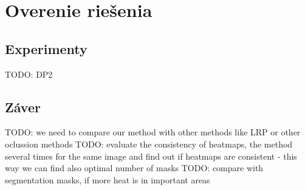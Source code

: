 \chapter{Overenie riešenia}

\section{Experimenty}

TODO: DP2

\section{Záver}

TODO: we need to compare our method with other methods like LRP or other oclussion methods
TODO: evaluate the consistency of heatmaps, the method several times for the same image and find out if heatmaps are consistent - this way we can find also optimal number of masks
TODO: compare with segmentation masks, if more heat is in important areas

